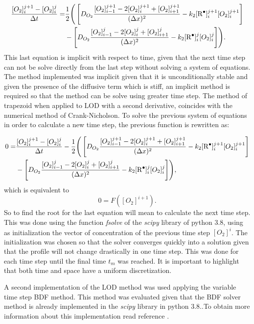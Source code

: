\documentclass[twoside,11pt]{report}
\begin{document}
\begin{align}
    \frac{[O_2]^{j+1}_i-[O_2]^j_i}{\Delta t}=&\frac{1}{2}\Biggr(\left[ D_{O_2} \frac{[O_2]_{i-1}^{j+1}-2[O_2]_{i}^{j+1}+[O_2]_{i+1}^{j+1}}{(\Delta x)^2}-k_2[\ce{R^.}]_i^{j+1}[O_2]_i^{j+1}\right] \nonumber\\
    &-\left[D_{O_2}\frac{[O_2]_{i-1}^{j}-2[O_2]_{i}^{j}+[O_2]_{i+1}^{j}}{(\Delta x)^2}-k_2[\ce{R^.}]_i^{j}[O_2]_i^{j}\right]\Biggr).
\end{align}
This last equation is implicit with respect to time, given that the next time step can not be solve directly from the last step without solving a system of equations. The method implemented was implicit given that it is unconditionally stable and given the presence of the diffusive term which is stiff, an implicit method is required so that the method can be solve using greater time step.  The method of trapezoid when applied to LOD with a second derivative, coincides with the numerical method of Crank-Nicholson. To solve the previous system of equations in order to calculate a new time step, the previous function is rewritten as:

\begin{align}
    0=&\frac{[O_2]^{j+1}_i-[O_2]^j_i}{\Delta t}-\frac{1}{2}\Biggr(\left[ D_{O_2} \frac{[O_2]_{i-1}^{j+1}-2[O_2]_{i}^{j+1}+[O_2]_{i+1}^{j+1}}{(\Delta x)^2}-k_2[\ce{R^.}]_i^{j+1}[O_2]_i^{j+1}\right] \nonumber\\
    &-\left[D_{O_2}\frac{[O_2]_{i-1}^{j}-2[O_2]_{i}^{j}+[O_2]_{i+1}^{j}}{(\Delta x)^2}-k_2[\ce{R^.}]_i^{j}[O_2]_i^{j}\right]\Biggr),
\end{align}
which is equivalent to 
\begin{equation}
    0=F([O_2]^{i+1}). 
\end{equation}
So to find the root for the last equation will mean to calculate the next time step. This was done using the function \textit{fsolve} of the \textit{scipy} library of python 3.8, using as initialization the vector of concentration of the previous time step $[O_2]^{i}$. The initialization was chosen so that the solver converges quickly into a solution given that the profile will not change drastically in one time step. This was done for each time step until the final time $t_m$ was reached. It is important to highlight that both time and space have a uniform discretization. 

A second implementation of the LOD method was used applying the variable time step BDF method. This method was evaluated given that the BDF solver method is already implemented in the \textit{scipy} library in python 3.8..To obtain more information about this implementation read reference \cite{shampine1997matlab}.
\end{document}
